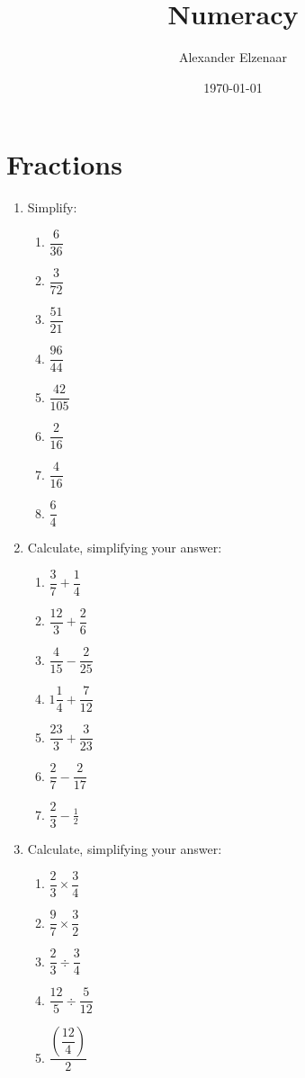\documentclass{amsbook}
\title{Numeracy}
\author{Alexander Elzenaar}
\date{\today}
\begin{document}
\maketitle
\tableofcontents

\section{Fractions}
\begin{enumerate}
  \item Simplify:
    \begin{enumerate}
      \item $ \dfrac{6}{36} $
      \item $ \dfrac{3}{72} $
      \item $ \dfrac{51}{21} $
      \item $ \dfrac{96}{44} $
      \item $ \dfrac{42}{105} $
      \item $ \dfrac{2}{16} $
      \item $ \dfrac{4}{16} $
      \item $ \dfrac{6}{4} $
    \end{enumerate}
  \item Calculate, simplifying your answer:
    \begin{enumerate}
      \item $ \dfrac{3}{7} + \dfrac{1}{4} $
      \item $ \dfrac{12}{3} + \dfrac{2}{6} $
      \item $ \dfrac{4}{15} - \dfrac{2}{25} $
      \item $ 1\dfrac{1}{4} + \dfrac{7}{12} $
      \item $ \dfrac{23}{3} + \dfrac{3}{23} $
      \item $ \dfrac{2}{7} - \dfrac{2}{17} $
      \item $ \dfrac{2}{3} - \frac{1}{2} $
    \end{enumerate}
  \item Calculate, simplifying your answer:
    \begin{enumerate}
      \item $ \dfrac{2}{3} \times \dfrac{3}{4} $
      \item $ \dfrac{9}{7} \times \dfrac{3}{2} $
      \item $ \dfrac{2}{3} \div \dfrac{3}{4} $
      \item $ \dfrac{12}{5} \div \dfrac{5}{12} $
      \item $ \dfrac{\left(\dfrac{12}{4}\right)}{2} $

\end{enumerate}
\end{enumerate}
\end{document}
